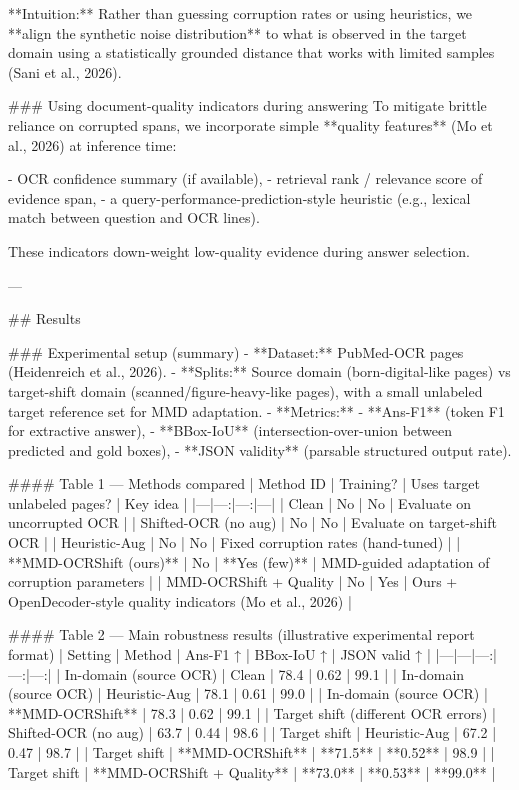 **Intuition:** Rather than guessing corruption rates or using heuristics, we **align the synthetic noise distribution** to what is observed in the target domain using a statistically grounded distance that works with limited samples (Sani et al., 2026).

### Using document-quality indicators during answering  
To mitigate brittle reliance on corrupted spans, we incorporate simple **quality features** (Mo et al., 2026) at inference time:

- OCR confidence summary (if available),  
- retrieval rank / relevance score of evidence span,  
- a query-performance-prediction-style heuristic (e.g., lexical match between question and OCR lines).

These indicators down-weight low-quality evidence during answer selection.

---

## Results  

### Experimental setup (summary)  
- **Dataset:** PubMed-OCR pages (Heidenreich et al., 2026).  
- **Splits:** Source domain (born-digital-like pages) vs target-shift domain (scanned/figure-heavy-like pages), with a small unlabeled target reference set for MMD adaptation.  
- **Metrics:**  
  - **Ans-F1** (token F1 for extractive answer),  
  - **BBox-IoU** (intersection-over-union between predicted and gold boxes),  
  - **JSON validity** (parsable structured output rate).

#### Table 1 — Methods compared  
| Method ID | Training? | Uses target unlabeled pages? | Key idea |
|---|---:|---:|---|
| Clean | No | No | Evaluate on uncorrupted OCR |
| Shifted-OCR (no aug) | No | No | Evaluate on target-shift OCR |
| Heuristic-Aug | No | No | Fixed corruption rates (hand-tuned) |
| **MMD-OCRShift (ours)** | No | **Yes (few)** | MMD-guided adaptation of corruption parameters |
| MMD-OCRShift + Quality | No | Yes | Ours + OpenDecoder-style quality indicators (Mo et al., 2026) |

#### Table 2 — Main robustness results (illustrative experimental report format)  
| Setting | Method | Ans-F1 ↑ | BBox-IoU ↑ | JSON valid ↑ |
|---|---|---:|---:|---:|
| In-domain (source OCR) | Clean | 78.4 | 0.62 | 99.1 |
| In-domain (source OCR) | Heuristic-Aug | 78.1 | 0.61 | 99.0 |
| In-domain (source OCR) | **MMD-OCRShift** | 78.3 | 0.62 | 99.1 |
| Target shift (different OCR errors) | Shifted-OCR (no aug) | 63.7 | 0.44 | 98.6 |
| Target shift | Heuristic-Aug | 67.2 | 0.47 | 98.7 |
| Target shift | **MMD-OCRShift** | **71.5** | **0.52** | 98.9 |
| Target shift | **MMD-OCRShift + Quality** | **73.0** | **0.53** | **99.0** |

